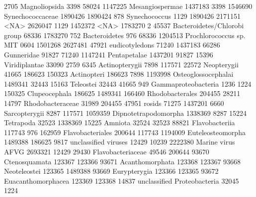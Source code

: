\documentclass{article}
\begin{document}
\begin{Schunk}
\begin{Soutput}
2705                                  Magnoliopsida    3398   58024
1147225                             Mesangiospermae 1437183    3398
1546690                            Synechococcaceae 1890426 1890424
878                                   Synechococcus    1129 1890426
2171151                                        <NA> 2626047    1129
1452372                                        <NA> 1783270       2
45537                  Bacteroidetes/Chlorobi group   68336 1783270
752                                   Bacteroidetes     976   68336
1204513                Prochlorococcus sp. MIT 0604 1501268 2627481
47921                                eudicotyledons   71240 1437183
66286                                    Gunneridae   91827   71240
1147241                                Pentapetalae 1437201   91827
15396                                 Viridiplantae   33090    2759
6345                                 Actinopterygii    7898  117571
22572                                   Neopterygii   41665  186623
150323                                  Actinopteri  186623    7898
1193998                         Osteoglossocephalai 1489341   32443
15163                                     Teleostei   32443   41665
949                             Gammaproteobacteria    1236    1224
150325                                Clupeocephala  186625 1489341
166460                              Rhodobacterales  204455   28211
14797                              Rhodobacteraceae   31989  204455
47951                                        rosids   71275 1437201
6660                                  Sarcopterygii    8287  117571
1059359                        Dipnotetrapodomorpha 1338369    8287
15224                                     Tetrapoda   32523 1338369
15225                                       Amniota   32524   32523
88821                                Flavobacteriia  117743     976
162959                             Flavobacteriales  200644  117743
1194009                           Euteleosteomorpha 1489388  186625
9817                           unclassified viruses   12429   10239
2222380                           Marine virus AFVG 2693321   12429
29430                             Flavobacteriaceae   49546  200644
93670                                 Ctenosquamata  123367  123366
93671                               Acanthomorphata  123368  123367
93668                                  Neoteleostei  123365 1489388
93669                                  Eurypterygia  123366  123365
93672                            Euacanthomorphacea  123369  123368
14837                   unclassified Proteobacteria   32045    1224

\end{Soutput}
\end{Schunk}
\end{document}
